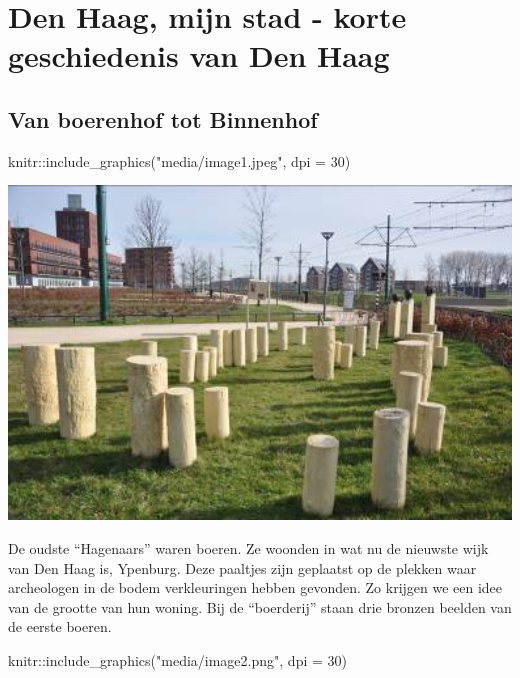 \documentclass[
  a4paper,
]{book}
\newenvironment{Shaded}{\begin{snugshade}}{\end{snugshade}}
\newcommand{\AttributeTok}[1]{\textcolor[rgb]{0.77,0.63,0.00}{#1}}
\newcommand{\DecValTok}[1]{\textcolor[rgb]{0.00,0.00,0.81}{#1}}
\newcommand{\FunctionTok}[1]{\textcolor[rgb]{0.00,0.00,0.00}{#1}}
\newcommand{\NormalTok}[1]{#1}
\newcommand{\SpecialCharTok}[1]{\textcolor[rgb]{0.00,0.00,0.00}{#1}}
\newcommand{\StringTok}[1]{\textcolor[rgb]{0.31,0.60,0.02}{#1}}
\begin{document}
\hypertarget{den-haag-mijn-stad---korte-geschiedenis-van-den-haag}{%
\chapter{Den Haag, mijn stad - korte geschiedenis van Den Haag}\label{den-haag-mijn-stad---korte-geschiedenis-van-den-haag}}

\hypertarget{van-boerenhof-tot-binnenhof}{%
\section{Van boerenhof tot Binnenhof}\label{van-boerenhof-tot-binnenhof}}

\begin{Shaded}
\begin{Highlighting}[]
\NormalTok{knitr}\SpecialCharTok{::}\FunctionTok{include\_graphics}\NormalTok{(}\StringTok{"media/image1.jpeg"}\NormalTok{, }\AttributeTok{dpi =} \DecValTok{30}\NormalTok{)}
\end{Highlighting}
\end{Shaded}

\includegraphics[width=12.83in]{media/image1}

De oudste ``Hagenaars'' waren boeren. Ze woonden in wat nu de nieuwste wijk van Den Haag is, Ypenburg. Deze paaltjes zijn geplaatst op de plekken waar archeologen in de bodem verkleuringen hebben gevonden. Zo krijgen we een idee van de grootte van hun woning. Bij de ``boerderij'' staan drie bronzen beelden van de eerste boeren.

\begin{Shaded}
\begin{Highlighting}[]
\NormalTok{knitr}\SpecialCharTok{::}\FunctionTok{include\_graphics}\NormalTok{(}\StringTok{"media/image2.png"}\NormalTok{, }\AttributeTok{dpi =} \DecValTok{30}\NormalTok{)}
\end{Highlighting}
\end{Shaded}
\end{document}

